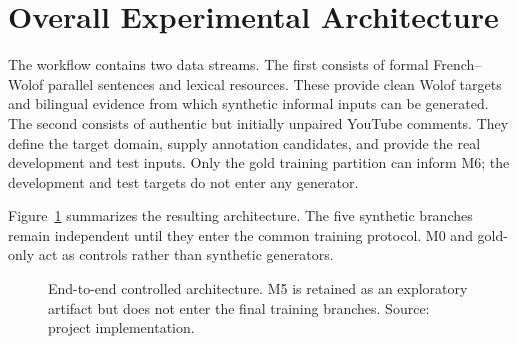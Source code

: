 \documentclass[12pt, a4paper, twoside, openany]{report}
\begin{document}
\section{Overall Experimental Architecture}

The workflow contains two data streams. The first consists of formal French--Wolof parallel sentences and lexical resources. These provide clean Wolof targets and bilingual evidence from which synthetic informal inputs can be generated. The second consists of authentic but initially unpaired YouTube comments. They define the target domain, supply annotation candidates, and provide the real development and test inputs. Only the gold training partition can inform M6; the development and test targets do not enter any generator.

Figure~\ref{fig:pipeline} summarizes the resulting architecture. The five synthetic branches remain independent until they enter the common training protocol. M0 and gold-only act as controls rather than synthetic generators.

\begin{figure}[H]
	\centering
	\caption[Experimental architecture]{End-to-end controlled architecture. M5 is retained as an exploratory artifact but does not enter the final training branches. Source: project implementation.}
	\label{fig:pipeline}
\end{figure}
\end{document}

